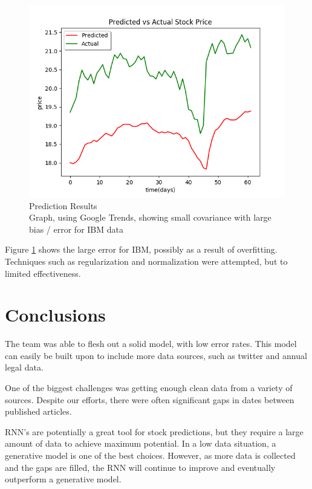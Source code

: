 \documentclass{article}
\begin{document}
\begin{figure}[H]
	\centering
    \includegraphics[scale=0.5]{googleIBM.png}
  \caption{Prediction Results \\
  \small Graph, using Google Trends, showing small covariance with large bias / error for IBM data}
  \label{fig:googleibm}
\end{figure}

Figure \ref{fig:googleibm} shows the large error for IBM, possibly as a result of overfitting. Techniques such as regularization and normalization were attempted, but to limited effectiveness. 

\section{Conclusions}

The team was able to flesh out a solid model, with low error rates. This model can easily be built upon to include more data sources, such as twitter and annual legal data. 

One of the biggest challenges was getting enough clean data from a variety of sources. Despite our efforts, there were often significant gaps in dates between published articles.

RNN’s are potentially a great tool for stock predictions, but they require a large amount of data to achieve maximum potential. In a low data situation, a generative model is one of the best choices. However, as more data is collected and the gaps are filled, the RNN will continue to improve and eventually outperform a generative model. 
\end{document}

